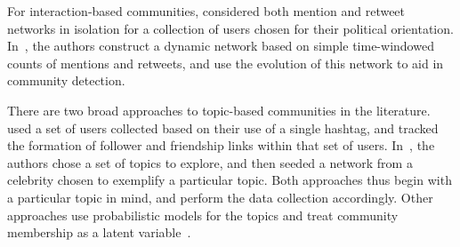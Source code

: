 For interaction-based communities, \cite{conover2011political} considered both mention and retweet networks in isolation for a collection of users chosen for their political orientation. In~\cite{deitrick2013mutually}, the authors construct a dynamic network based on simple time-windowed counts of mentions and retweets, and use the evolution of this network to aid in community detection.

There are two broad approaches to topic-based communities in the literature. \cite{rossi2012conversation} used a set of users collected based on their use of a single hashtag, and tracked the formation of follower and friendship links within that set of users. In~\cite{lim2012following}, the authors chose a set of topics to explore, and then seeded a network from a celebrity chosen to exemplify a particular topic. Both approaches thus begin with a particular topic in mind, and perform the data collection accordingly. Other approaches use probabilistic models for the topics and treat community membership as a latent variable~\cite{yin2012latent}.











